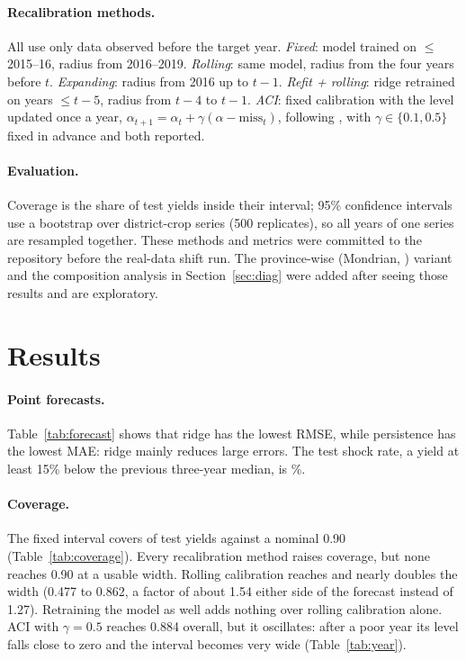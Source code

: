\documentclass[11pt]{article}
\begin{document}
\paragraph{Recalibration methods.} All use only data observed before the target year. \emph{Fixed}: model trained on $\le$ 2015--16, radius from 2016--2019. \emph{Rolling}: same model, radius from the four years before $t$. \emph{Expanding}: radius from 2016 up to $t-1$. \emph{Refit + rolling}: ridge retrained on years $\le t-5$, radius from $t-4$ to $t-1$. \emph{ACI}: fixed calibration with the level updated once a year, $\alpha_{t+1} = \alpha_t + \gamma(\alpha - \mathrm{miss}_t)$, following \citet{gibbs2021}, with $\gamma \in \{0.1, 0.5\}$ fixed in advance and both reported.

\paragraph{Evaluation.} Coverage is the share of test yields inside their interval; 95\% confidence intervals use a bootstrap over district-crop series (500 replicates), so all years of one series are resampled together. These methods and metrics were committed to the repository before the real-data shift run. The province-wise (Mondrian, \citealp{vovk2005}) variant and the composition analysis in Section~\ref{sec:diag} were added after seeing those results and are exploratory.

\section{Results}
\paragraph{Point forecasts.} Table~\ref{tab:forecast} shows that ridge has the lowest RMSE, while persistence has the lowest MAE: ridge mainly reduces large errors. The test shock rate, a yield at least 15\% below the previous three-year median, is \ShockRate\%.

\begin{table}[!htbp]
\centering
\caption{Point forecasts on the log-yield scale, test years 2020--21 to 2024--25 (\TestN{} forecasts, cleaned panel).}
\label{tab:forecast}

\end{table}

\paragraph{Coverage.} The fixed interval covers \FixedCov{} of test yields against a nominal 0.90 (Table~\ref{tab:coverage}). Every recalibration method raises coverage, but none reaches 0.90 at a usable width. Rolling calibration reaches \RollCov{} and nearly doubles the width (0.477 to 0.862, a factor of about 1.54 either side of the forecast instead of 1.27). Retraining the model as well adds nothing over rolling calibration alone. ACI with $\gamma = 0.5$ reaches 0.884 overall, but it oscillates: after a poor year its level falls close to zero and the interval becomes very wide (Table~\ref{tab:year}).
\end{document}

